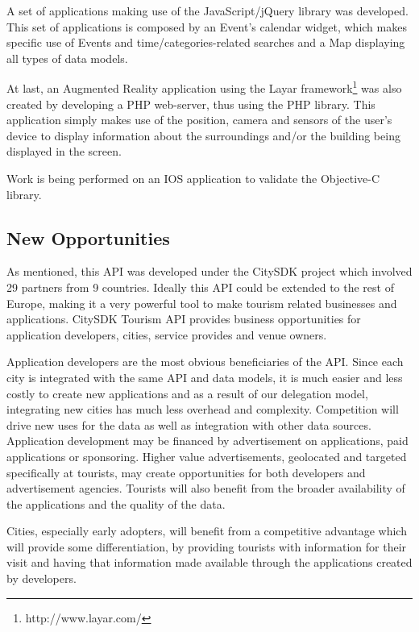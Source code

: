 \documentclass[times,doublespace]{ettauth}%
\begin{document}
A set of applications making use of the JavaScript/jQuery library was developed. This set of applications is composed by an Event's calendar widget, which makes specific use of Events and time/categories-related searches and a Map displaying all types of data models.

At last, an Augmented Reality application using the Layar framework\footnote{http://www.layar.com/} was also created by developing a PHP web-server, thus using the PHP library. 
This application simply makes use of the position, camera and sensors of the user's device to display information about the surroundings and/or the building being displayed in the screen.

Work is being performed on an IOS application to validate the Objective-C library.

\subsection{New Opportunities}
As mentioned, this API was developed under the CitySDK project which involved 29 partners from 9 countries. 
Ideally this API could be extended to the rest of Europe, making it a very powerful tool to make tourism related businesses and applications.
CitySDK Tourism API provides business opportunities for application developers, cities, service provides and venue owners.

Application developers are the most obvious beneficiaries of the API\@.
Since each city is integrated with the same API and data models, it is much easier and less costly to create new applications and as a result of our delegation model, integrating new cities has much less overhead and complexity.
Competition will drive new uses for the data as well as integration with other data sources.
Application development may be financed by advertisement on applications, paid applications or sponsoring.
Higher value advertisements, geolocated and targeted specifically at tourists, may create opportunities for both developers and advertisement agencies.
Tourists will also benefit from the broader availability of the applications and the quality of the data.

Cities, especially early adopters, will benefit from a competitive advantage which will provide some differentiation, by providing tourists with information for their visit and having that information made available through the applications created by developers.
\end{document}
